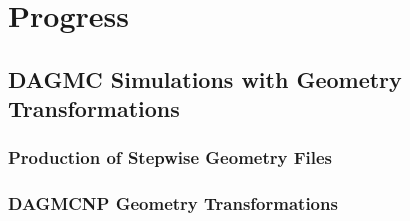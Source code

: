 \chapter{Progress} \label{ch:progress}

\section{DAGMC Simulations with Geometry Transformations}\label{sec:dagmc_trans}

\subsection{Production of Stepwise Geometry Files}\label{sec:timestep_geoms}

\subsection{DAGMCNP Geometry Transformations}\label{sec:mcnp_tr}

